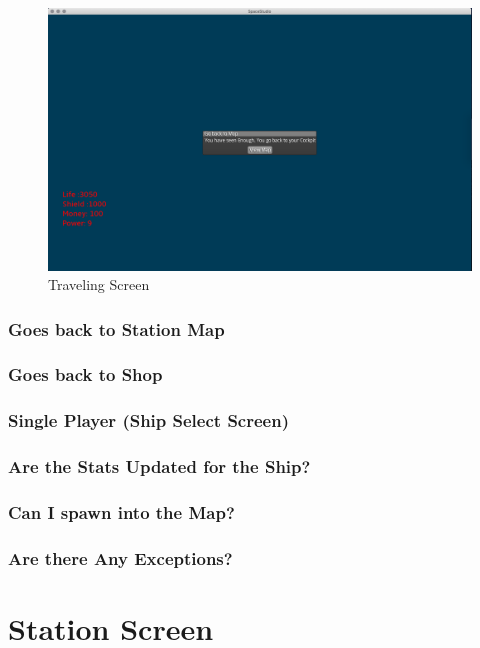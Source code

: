\documentclass[11pt]{article}
\begin{document}
\begin{figure}[htp]
\centering
\includegraphics[scale=0.3]{TestProtocolBilder/flee.png}
\caption{Traveling Screen}
\end{figure}

\subsubsection{Goes back to Station Map}
\subsubsection{Goes back to Shop}


\subsubsection{Single Player (Ship Select Screen)}

\subsubsection{Are the Stats Updated for the Ship?}
\subsubsection{Can I spawn into the Map?}
\subsubsection{Are there Any Exceptions?}



\section{Station Screen}
\label{sec:orga891bce}
\end{document}
